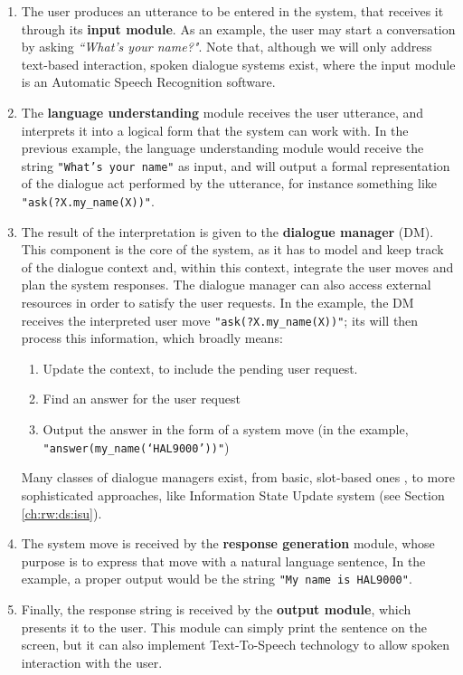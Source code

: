  \begin{enumerate}
	\item The user produces an utterance to be entered in the system, that receives it through its \textbf{input module}. As an example, the user may start a conversation by asking \textit{``What's your name?"}. Note that, although we will only address text-based interaction, spoken dialogue systems exist, where the input module is an Automatic Speech Recognition software.
	\item The \textbf{language understanding} module receives the user utterance, and interprets it into a logical form that the system can work with. In the previous example, the language understanding module would receive the string \texttt{"What's your name"} as input, and will output a formal representation of the dialogue act performed by the utterance, for instance something like \texttt{"ask(?X.my\_name(X))"}.
	\item The result of the interpretation is given to the \textbf{dialogue manager} (DM). This component is the core of the system, as it has to model and keep track of the dialogue context and, within this context, integrate the user moves and plan the system responses. The dialogue manager can also access external resources in order to satisfy the user requests. In the example, the DM receives the interpreted user move \texttt{"ask(?X.my\_name(X))"}; its will then process this information, which broadly means:
	\begin{enumerate}
		\item Update the context, to include the pending user request.
		\item Find an answer for the user request
		\item Output the answer in the form of a system move (in the example, \\ \texttt{"answer(my\_name(`HAL9000'))"})
	\end{enumerate}
	Many classes of dialogue managers exist, from basic, slot-based ones \citep{Jokinen2009}, to more sophisticated approaches, like Information State Update system (see Section \ref{ch:rw:ds:isu}).
	\item The system move is received by the \textbf{response generation} module, whose purpose is to express that move with a natural language sentence, In the example, a proper output would be the string \texttt{"My name is HAL9000"}.
	\item Finally, the response string is received by the \textbf{output module}, which presents it to the user. This module can simply print the sentence on the screen, but it can also implement Text-To-Speech technology to allow spoken interaction with the user.
\end{enumerate}

